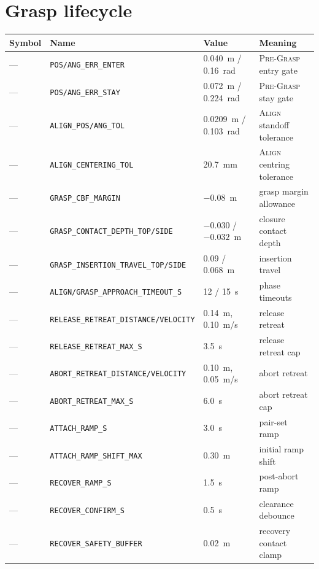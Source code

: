 \section{Grasp lifecycle}
\begin{tabularx}{\linewidth}{@{}l>{\scriptsize}ll>{\raggedright\arraybackslash}X@{}}
\toprule
Symbol & Name & Value & Meaning \\
\midrule
--- & \texttt{POS/ANG\_ERR\_ENTER} & 0.040~m / 0.16~rad & \textsc{Pre-Grasp} entry gate \\
--- & \texttt{POS/ANG\_ERR\_STAY} & 0.072~m / 0.224~rad & \textsc{Pre-Grasp} stay gate \\
--- & \texttt{ALIGN\_POS/ANG\_TOL} & 0.0209~m / 0.103~rad & \textsc{Align} standoff tolerance \\
--- & \texttt{ALIGN\_CENTERING\_TOL} & 20.7~mm & \textsc{Align} centring tolerance \\
--- & \texttt{GRASP\_CBF\_MARGIN} & $-0.08$~m & grasp margin allowance \\
--- & \texttt{GRASP\_CONTACT\_DEPTH\_TOP/SIDE} & $-0.030$ / $-0.032$~m & closure contact depth \\
--- & \texttt{GRASP\_INSERTION\_TRAVEL\_TOP/SIDE} & 0.09 / 0.068~m & insertion travel \\
--- & \texttt{ALIGN/GRASP\_APPROACH\_TIMEOUT\_S} & 12 / 15~s & phase timeouts \\
--- & \texttt{RELEASE\_RETREAT\_DISTANCE/VELOCITY} & 0.14~m, 0.10~m/s & release retreat \\
--- & \texttt{RELEASE\_RETREAT\_MAX\_S} & 3.5~s & release retreat cap \\
--- & \texttt{ABORT\_RETREAT\_DISTANCE/VELOCITY} & 0.10~m, 0.05~m/s & abort retreat \\
--- & \texttt{ABORT\_RETREAT\_MAX\_S} & 6.0~s & abort retreat cap \\
--- & \texttt{ATTACH\_RAMP\_S} & 3.0~s & pair-set ramp \\
--- & \texttt{ATTACH\_RAMP\_SHIFT\_MAX} & 0.30~m & initial ramp shift \\
--- & \texttt{RECOVER\_RAMP\_S} & 1.5~s & post-abort ramp \\
--- & \texttt{RECOVER\_CONFIRM\_S} & 0.5~s & clearance debounce \\
--- & \texttt{RECOVER\_SAFETY\_BUFFER} & 0.02~m & recovery contact clamp \\
\bottomrule
\end{tabularx}

